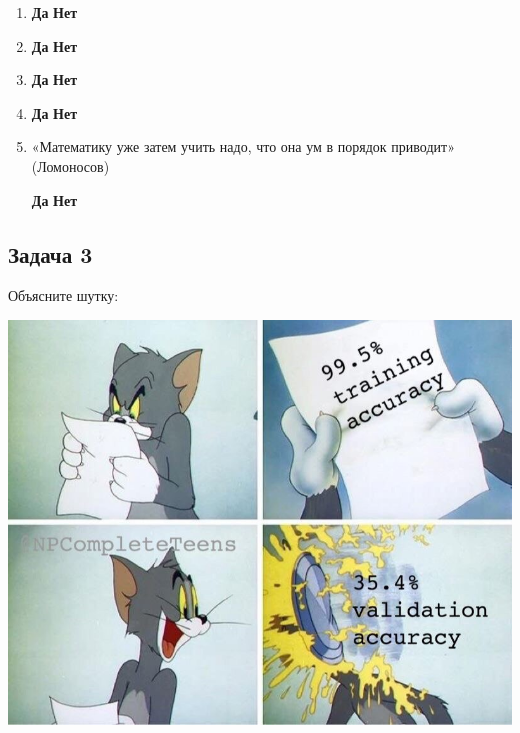 \documentclass[12pt, a4paper, oneside]{article}
\begin{document}
\begin{enumerate}
	\item 
	
	\hspace{2cm} \textbf{Да}  \hspace{4cm} \textbf{Нет} 
	
	\item
	
	\hspace{2cm} \textbf{Да}  \hspace{4cm} \textbf{Нет} 
	
	\item
	
	\hspace{2cm} \textbf{Да}  \hspace{4cm} \textbf{Нет} 
	
	\item 
	
	\hspace{2cm} \textbf{Да}  \hspace{4cm} \textbf{Нет} 
	
	\item  	«Математику уже затем учить надо, что она ум в порядок приводит» (Ломоносов)
	
	\hspace{2cm} \textbf{Да}  \hspace{4cm} \textbf{Нет} 
	
\end{enumerate}




\subsection*{Задача 3}

Объясните шутку: 

\begin{center}
	\includegraphics[scale=0.3]{memes2.jpg}
\end{center}
\end{document}
